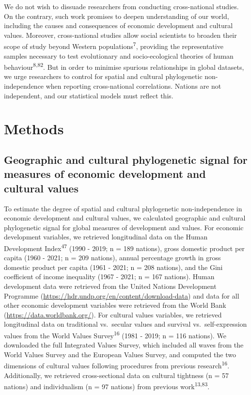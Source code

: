 \documentclass[
  man,floatsintext]{apa6}
\begin{document}
We do not wish to dissuade researchers from conducting cross-national studies. On the contrary, such work promises to deepen understanding of our world, including the causes and consequences of economic development and cultural values. Moreover, cross-national studies allow social scientists to broaden their scope of study beyond Western populations\textsuperscript{7}, providing the representative samples necessary to test evolutionary and socio-ecological theories of human behaviour\textsuperscript{8,82}. But in order to minimise spurious relationships in global datasets, we urge researchers to control for spatial and cultural phylogenetic non-independence when reporting cross-national correlations. Nations are not independent, and our statistical models must reflect this.

\hypertarget{methods}{%
\section{Methods}\label{methods}}

\hypertarget{geographic-and-cultural-phylogenetic-signal-for-measures-of-economic-development-and-cultural-values}{%
\subsection{Geographic and cultural phylogenetic signal for measures of economic development and cultural values}\label{geographic-and-cultural-phylogenetic-signal-for-measures-of-economic-development-and-cultural-values}}

To estimate the degree of spatial and cultural phylogenetic non-independence in economic development and cultural values, we calculated geographic and cultural phylogenetic signal for global measures of development and values. For economic development variables, we retrieved longitudinal data on the Human Development Index\textsuperscript{47} (1990 - 2019; n = 189 nations), gross domestic product per capita (1960 - 2021; n = 209 nations), annual percentage growth in gross domestic product per capita (1961 - 2021; n = 208 nations), and the Gini coefficient of income inequality (1967 - 2021; n = 167 nations). Human development data were retrieved from the United Nations Development Programme (\url{https://hdr.undp.org/en/content/download-data}) and data for all other economic development variables were retrieved from the World Bank (\url{https://data.worldbank.org/}). For cultural values variables, we retrieved longitudinal data on traditional vs.~secular values and survival vs.~self-expression values from the World Values Survey\textsuperscript{16} (1981 - 2019; n = 116 nations). We downloaded the full Integrated Values Survey, which included all waves from the World Values Survey and the European Values Survey, and computed the two dimensions of cultural values following procedures from previous research\textsuperscript{16}. Additionally, we retrieved cross-sectional data on cultural tightness (n = 57 nations) and individualism (n = 97 nations) from previous work\textsuperscript{13,83}.
\end{document}
